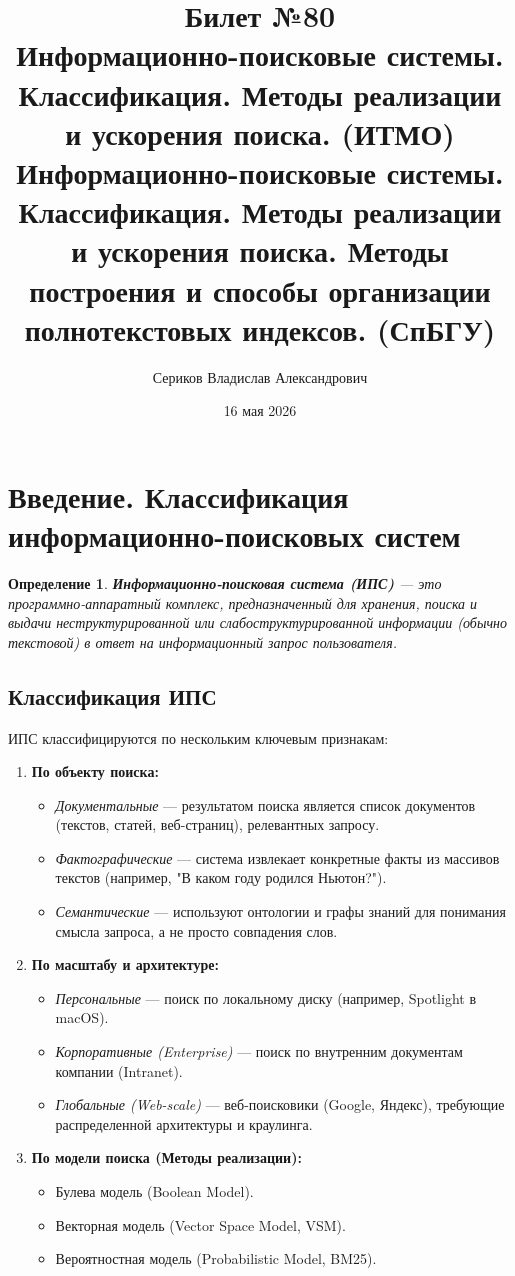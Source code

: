 \documentclass[12pt,a4paper]{article}
\title{Билет №80 \\ \small Информационно-поисковые системы. Классификация. Методы реализации и ускорения поиска. (ИТМО) \\ Информационно-поисковые системы. Классификация. Методы реализации и ускорения поиска. Методы построения и способы организации полнотекстовых индексов. (СпБГУ)}
\author{Сериков Владислав Александрович}
\date{16 мая 2026}
\newtheorem{definition}{Определение}
\begin{document}
\maketitle
\tableofcontents
\newpage

\section{Введение. Классификация информационно-поисковых систем}

\begin{definition}
\textbf{Информационно-поисковая система (ИПС)} --- это программно-аппаратный комплекс, предназначенный для хранения, поиска и выдачи неструктурированной или слабоструктурированной информации (обычно текстовой) в ответ на информационный запрос пользователя.
\end{definition}

\subsection{Классификация ИПС}

ИПС классифицируются по нескольким ключевым признакам:

\begin{enumerate}
    \item \textbf{По объекту поиска:}
    \begin{itemize}
        \item \textit{Документальные} --- результатом поиска является список документов (текстов, статей, веб-страниц), релевантных запросу.
        \item \textit{Фактографические} --- система извлекает конкретные факты из массивов текстов (например, "В каком году родился Ньютон?").
        \item \textit{Семантические} --- используют онтологии и графы знаний для понимания смысла запроса, а не просто совпадения слов.
    \end{itemize}

    \item \textbf{По масштабу и архитектуре:}
    \begin{itemize}
        \item \textit{Персональные} --- поиск по локальному диску (например, Spotlight в macOS).
        \item \textit{Корпоративные (Enterprise)} --- поиск по внутренним документам компании (Intranet).
        \item \textit{Глобальные (Web-scale)} --- веб-поисковики (Google, Яндекс), требующие распределенной архитектуры и краулинга.
    \end{itemize}

    \item \textbf{По модели поиска (Методы реализации):}
    \begin{itemize}
        \item Булева модель (Boolean Model).
        \item Векторная модель (Vector Space Model, VSM).
        \item Вероятностная модель (Probabilistic Model, BM25).
    \end{itemize}
\end{enumerate}
\end{document}
